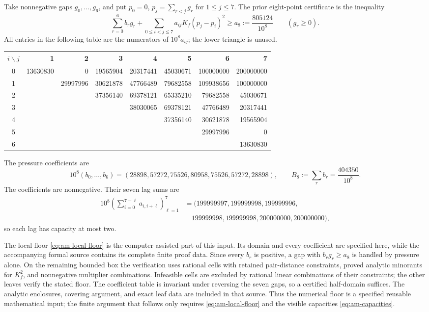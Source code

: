 \documentclass[11pt,reqno]{amsart}
\numberwithin{equation}{section}
\begin{document}
Take nonnegative gaps $g_0,\ldots,g_6$, and put
$p_0=0$, $p_j=\sum_{r<j}g_r$ for $1\le j\le7$.
The prior eight-point certificate \cite{Lavery2026} is the inequality
\begin{equation}
 \sum_{r=0}^6b_rg_r+
 \sum_{0\le i<j\le7}a_{ij}K_f(p_j-p_i)^2
 \ge a_8:=\frac{805124}{10^8}
 \qquad(g_r\ge0).
 \label{eq:am-local-floor}
\end{equation}
All entries in the following table are the numerators of $10^8a_{ij}$;
the lower triangle is unused.
\begin{center}
\small
\setlength{\tabcolsep}{3.5pt}
\begin{tabular}{c|rrrrrrr}
$i\backslash j$&1&2&3&4&5&6&7\\\hline
0&13630830&0&19565904&20317441&45030671&100000000&200000000\\
1&&29997996&30621878&47766489&79682558&109938656&100000000\\
2&&&37356140&69378121&65335210&79682558&45030671\\
3&&&&38030065&69378121&47766489&20317441\\
4&&&&&37356140&30621878&19565904\\
5&&&&&&29997996&0\\
6&&&&&&&13630830
\end{tabular}
\end{center}
The pressure coefficients are
\begin{equation}
 10^8(b_0,\ldots,b_6)
 =(28898,57272,75526,80958,75526,57272,28898),\qquad
 B_8:=\sum_rb_r=\frac{404350}{10^8}.
 \label{eq:am-pressures}
\end{equation}
The coefficients are nonnegative. Their seven lag sums are
\begin{equation}
\begin{split}
10^8\left(\sum_{i=0}^{7-\ell}a_{i,i+\ell}\right)_{\ell=1}^7
&=(199999997,199999998,199999996,\\
&\quad199999998,199999998,200000000,200000000),
\end{split}
\label{eq:am-capacities}
\end{equation}
so each lag has capacity at most two.

The local floor \eqref{eq:am-local-floor} is the computer-assisted
part of this input. Its domain and every coefficient are specified
here, while the accompanying formal source contains its complete
finite proof data. Since every $b_r$ is positive, a gap with
$b_rg_r\ge a_8$ is handled by pressure alone. On the remaining
bounded box the verification uses rational cells with retained
pair-distance constraints, proved analytic minorants for $K_f^2$,
and nonnegative multiplier combinations. Infeasible cells are excluded
by rational linear combinations of their constraints; the other leaves
verify the stated floor. The coefficient table is invariant under
reversing the seven gaps, so a certified half-domain suffices.
The analytic enclosures, covering argument, and exact leaf data are
included in that source. Thus the numerical floor is a specified
reusable mathematical input; the finite argument that follows only
requires \eqref{eq:am-local-floor} and the visible capacities
\eqref{eq:am-capacities}.
\end{document}
